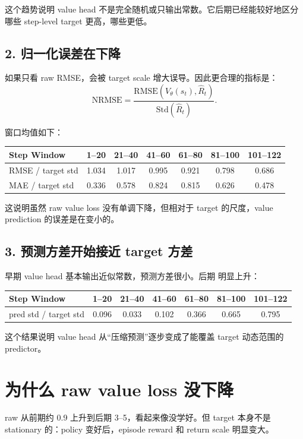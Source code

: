 \documentclass[10pt]{ctexart}
\begin{document}
这个趋势说明 value head 不是完全随机或只输出常数。它后期已经能较好地区分哪些 step-level target 更高，哪些更低。

\subsection*{2. 归一化误差在下降}
如果只看 raw RMSE，会被 target scale 增大误导。因此更合理的指标是：
\begin{equation}
\mathrm{NRMSE} = \frac{\mathrm{RMSE}(V_\theta(s_t), \hat R_t)}{\mathrm{Std}(\hat R_t)}.
\end{equation}

窗口均值如下：
\begin{center}
\begin{tabular}{lcccccc}
\toprule
Step Window & 1--20 & 21--40 & 41--60 & 61--80 & 81--100 & 101--122 \\
\midrule
RMSE / target std & 1.034 & 1.017 & 0.995 & 0.921 & 0.798 & 0.686 \\
MAE / target std & 0.336 & 0.578 & 0.824 & 0.815 & 0.626 & 0.478 \\
\bottomrule
\end{tabular}
\end{center}

这说明虽然 raw value loss 没有单调下降，但相对于 target 的尺度，value prediction 的误差是在变小的。

\subsection*{3. 预测方差开始接近 target 方差}
早期 value head 基本输出近似常数，预测方差很小。后期  明显上升：
\begin{center}
\begin{tabular}{lcccccc}
\toprule
Step Window & 1--20 & 21--40 & 41--60 & 61--80 & 81--100 & 101--122 \\
\midrule
pred std / target std & 0.096 & 0.033 & 0.102 & 0.366 & 0.665 & 0.795 \\
\bottomrule
\end{tabular}
\end{center}

这个结果说明 value head 从“压缩预测”逐步变成了能覆盖 target 动态范围的 predictor。

\section*{为什么 raw value loss 没下降}
raw  从前期约 0.9 上升到后期 3--5，看起来像没学好。但 target 本身不是 stationary 的：policy 变好后，episode reward 和 return scale 明显变大。
\end{document}
